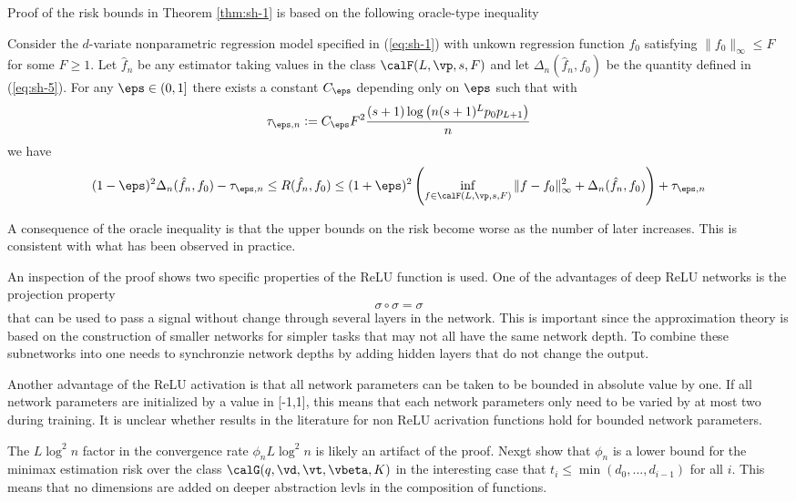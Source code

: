 Proof of the risk bounds in Theorem \ref{thm:sh-1} is based on the following oracle-type inequality
\begin{theorem}
	\label{thm:sh-2}
	Consider the $d$-variate nonparametric regression model specified in (\ref{eq:sh-1}) with unkown regression function $f_0$ satisfying $\|f_0\|_\infty \leq F$ for some $F\geq 1$. Let $\hat{f}_n$ be any estimator taking values in the class $\calF(L,\vp,s,F)$ and let $\Delta_n(\hat{f}_n,f_0)$ be the quantity defined in (\ref{eq:sh-5}). For any $\eps\in(0,1]$ there exists a constant $C_\eps$ depending only on $\eps$ such that with 
	\[\tau_{\eps,n} := C_\eps F^2 \frac{(s+1)\log\left(n(s+1)^Lp_0p_{L+1}\right)}{n}\]
	we have 
	\begin{dmath*}
		(1-\eps)^2\Delta_n(\hat{f}_n,f_0) -\tau_{\eps,n} \leq R(\hat{f}_n,f_0) \leq (1+\eps)^2 \left(\inf_{f\in\calF(L,\vp,s,F)} \|f-f_0\|^2_{\infty} + \Delta_n(\hat{f}_n,f_0)\right) +\tau_{\eps,n}
	\end{dmath*}
\end{theorem}
A consequence of the oracle inequality is that the upper bounds on the risk become worse as the number of later increases. This is consistent with what has been observed in practice. 

An inspection of the proof shows two specific properties of the ReLU function is used. One of the advantages of deep ReLU networks is the projection property 
\begin{equation}
	\label{eq:sh-11}
	\sigma \circ \sigma = \sigma
\end{equation}
that can be used to pass a signal without change through several layers in the network. This is important since the approximation theory is based on the construction of smaller networks for simpler tasks that may not all have the same network depth. To combine these subnetworks into one needs to synchronzie network depths by adding hidden layers that do not change the output.

Another advantage of the ReLU activation is that all network parameters can be taken to be bounded in absolute value by one. If all network parameters are initialized by a value in [-1,1], this means that each network parameters only need to be varied by at most two during training. It is unclear whether results in the literature for non ReLU acrivation functions hold for bounded network parameters. 

The $L\log^2 n $ factor in the convergence rate $\phi_n L\log^2 n$ is likely an artifact of the proof. Nexgt show that $\phi_n$ is a lower bound for the minimax estimation risk over the class $\calG(q,\vd, \vt,\vbeta, K)$ in the interesting case that $t_i \leq \min (d_0, \dots, d_{i-1})$ for all $i$. This means that no dimensions are added on deeper abstraction levls in the composition of functions. 

